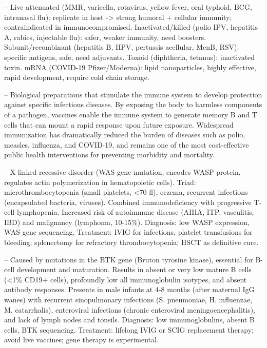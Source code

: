 -- Live attenuated (MMR, varicella, rotavirus, yellow fever, oral typhoid, BCG, intranasal flu): replicate in host -> strong humoral + cellular immunity; contraindicated in immunocompromised. Inactivated/killed (polio IPV, hepatitis A, rabies, injectable flu): safer, weaker immunity, need boosters. Subunit/recombinant (hepatitis B, HPV, pertussis acellular, MenB, RSV): specific antigens, safe, need adjuvants. Toxoid (diphtheria, tetanus): inactivated toxin. mRNA (COVID-19 Pfizer/Moderna): lipid nanoparticles, highly effective, rapid development, require cold chain storage.

-- Biological preparations that stimulate the immune system to develop protection against specific infectious diseases. By exposing the body to harmless components of a pathogen, vaccines enable the immune system to generate memory B and T cells that can mount a rapid response upon future exposure. Widespread immunization has dramatically reduced the burden of diseases such as polio, measles, influenza, and COVID-19, and remains one of the most cost-effective public health interventions for preventing morbidity and mortality.

-- X-linked recessive disorder (WAS gene mutation, encodes WASP protein, regulates actin polymerization in hematopoietic cells). Triad: microthrombocytopenia (small platelets, <70 fl), eczema, recurrent infections (encapsulated bacteria, viruses). Combined immunodeficiency with progressive T-cell lymphopenia. Increased risk of autoimmune disease (AIHA, ITP, vasculitis, IBD) and malignancy (lymphoma, 10-15\%). Diagnosis: low WASP expression, WAS gene sequencing. Treatment: IVIG for infections, platelet transfusions for bleeding; splenectomy for refractory thrombocytopenia; HSCT as definitive cure.

-- Caused by mutations in the BTK gene (Bruton tyrosine kinase), essential for B-cell development and maturation. Results in absent or very low mature B cells (<1\% CD19+ cells), profoundly low all immunoglobulin isotypes, and absent antibody responses. Presents in male infants at 4-8 months (after maternal IgG wanes) with recurrent sinopulmonary infections (S. pneumoniae, H. influenzae, M. catarrhalis), enteroviral infections (chronic enteroviral meningoencephalitis), and lack of lymph nodes and tonsils. Diagnosis: low immunoglobulins, absent B cells, BTK sequencing. Treatment: lifelong IVIG or SCIG replacement therapy; avoid live vaccines; gene therapy is experimental.
